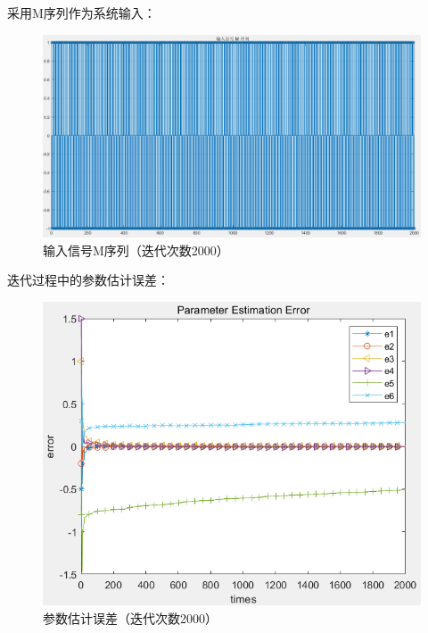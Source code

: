\documentclass[UTF8]{article}
\begin{document}
采用M序列作为系统输入：
\begin{figure}[H]
    \centering %
    \includegraphics[width=.8\textwidth]{figure/输入信号M序列（迭代次数2000）.png} 
    \caption{输入信号M序列（迭代次数2000）} %
\end{figure}

迭代过程中的参数估计误差：
\begin{figure}[H]
    \centering %
    \includegraphics[width=.8\textwidth]{figure/递推极大似然-参数估计误差（迭代次数2000）.png} 
    \caption{参数估计误差（迭代次数2000）} %
\end{figure}
\end{document}
